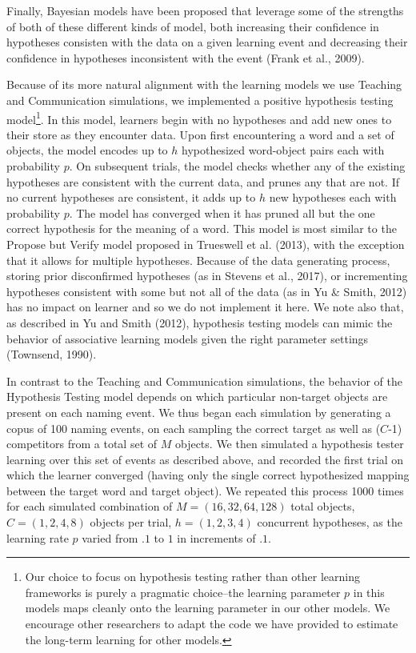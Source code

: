 \documentclass[english,,man,floatsintext]{apa6}
\begin{document}
Finally, Bayesian models have been proposed that leverage some of the strengths of both of these different kinds of model, both increasing their confidence in hypotheses consisten with the data on a given learning event and decreasing their confidence in hypotheses inconsistent with the event (Frank et al., 2009).

Because of its more natural alignment with the learning models we use Teaching and Communication simulations, we implemented a positive hypothesis testing model\footnote{Our choice to focus on hypothesis testing rather than other learning frameworks is purely a pragmatic choice--the learning parameter \(p\) in this models maps cleanly onto the learning parameter in our other models. We encourage other researchers to adapt the code we have provided to estimate the long-term learning for other models.}. In this model, learners begin with no hypotheses and add new ones to their store as they encounter data. Upon first encountering a word and a set of objects, the model encodes up to \(h\) hypothesized word-object pairs each with probability \(p\). On subsequent trials, the model checks whether any of the existing hypotheses are consistent with the current data, and prunes any that are not. If no current hypotheses are consistent, it adds up to \(h\) new hypotheses each with probability \(p\). The model has converged when it has pruned all but the one correct hypothesis for the meaning of a word. This model is most similar to the Propose but Verify model proposed in Trueswell et al. (2013), with the exception that it allows for multiple hypotheses. Because of the data generating process, storing prior disconfirmed hypotheses (as in Stevens et al., 2017), or incrementing hypotheses consistent with some but not all of the data (as in Yu \& Smith, 2012) has no impact on learner and so we do not implement it here. We note also that, as described in Yu and Smith (2012), hypothesis testing models can mimic the behavior of associative learning models given the right parameter settings (Townsend, 1990).

In contrast to the Teaching and Communication simulations, the behavior of the Hypothesis Testing model depends on which particular non-target objects are present on each naming event. We thus began each simulation by generating a copus of 100 naming events, on each sampling the correct target as well as (\(C\)-1) competitors from a total set of \(M\) objects. We then simulated a hypothesis tester learning over this set of events as described above, and recorded the first trial on which the learner converged (having only the single correct hypothesized mapping between the target word and target object). We repeated this process 1000 times for each simulated combination of \(M = (16, 32, 64, 128)\) total objects, \(C = (1,2,4,8)\) objects per trial, \(h = (1, 2, 3, 4)\) concurrent hypotheses, as the learning rate \(p\) varied from \(.1\) to \(1\) in increments of \(.1\).
\end{document}
